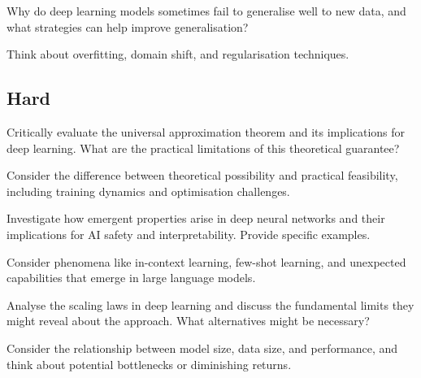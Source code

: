 \begin{exercisebox}[medium]
\begin{problem}
Why do deep learning models sometimes fail to generalise well to new data, and what strategies can help improve generalisation?
\end{problem}
\begin{hintbox}
Think about overfitting, domain shift, and regularisation techniques.
\end{hintbox}
\end{exercisebox}


\subsection*{Hard}

\begin{exercisebox}[hard]
\begin{problem}
Critically evaluate the universal approximation theorem and its implications for deep learning. What are the practical limitations of this theoretical guarantee?
\end{problem}
\begin{hintbox}
Consider the difference between theoretical possibility and practical feasibility, including training dynamics and optimisation challenges.
\end{hintbox}
\end{exercisebox}


\begin{exercisebox}[hard]
\begin{problem}
Investigate how emergent properties arise in deep neural networks and their implications for AI safety and interpretability. Provide specific examples.
\end{problem}
\begin{hintbox}
Consider phenomena like in-context learning, few-shot learning, and unexpected capabilities that emerge in large language models.
\end{hintbox}
\end{exercisebox}


\begin{exercisebox}[hard]
\begin{problem}
Analyse the scaling laws in deep learning and discuss the fundamental limits they might reveal about the approach. What alternatives might be necessary?
\end{problem}
\begin{hintbox}
Consider the relationship between model size, data size, and performance, and think about potential bottlenecks or diminishing returns.
\end{hintbox}
\end{exercisebox}



